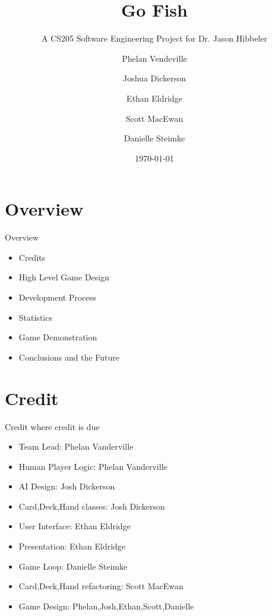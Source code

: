 \documentclass[compress, blue]{beamer}
\begin{document}
\title{Go Fish}   
\subtitle{A CS205 Software Engineering Project for Dr. Jason Hibbeler}
\author[Phelan,Josh,Ethan,Scott,Danielle]{Phelan Vendeville \and Joshua Dickerson \and Ethan Eldridge \and Scott MacEwan\and  Danielle Steimke} 
\date{\today} 



\begin{frame}
\maketitle
\end{frame}

\section{Overview}

\begin{frame}{Overview}

\begin{itemize}
\item<1>Credits
\item<2>High Level Game Design
\item<3>Development Process
\item<4>Statistics
\item<5>Game Demonstration
\item<6>Conclusions and the Future
\end{itemize}

\end{frame}

\section{Credit}

\begin{frame}{Credit where credit is due}
\begin{itemize}
\item<1>Team Lead: Phelan Vanderville
\item<1>Human Player Logic: Phelan Vanderville
\item<2>AI Design: Josh Dickerson
\item<2>Card,Deck,Hand classes: Josh Dickerson
\item<3>User Interface: Ethan Eldridge
\item<3>Presentation: Ethan Eldridge
\item<4>Game Loop: Danielle Steimke
\item<5>Card,Deck,Hand refactoring: Scott MacEwan
\item<6>Game Design: Phelan,Josh,Ethan,Scott,Danielle
\end{itemize}
\end{frame}
\end{document}
